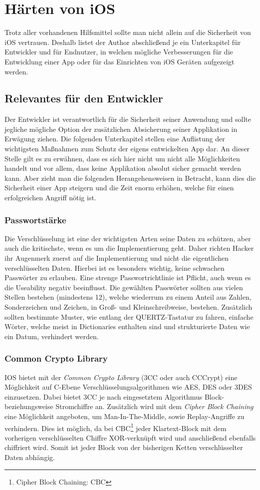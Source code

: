 \section{Härten von iOS}
	Trotz aller vorhandenen Hilfsmittel sollte man nicht allein auf die Sicherheit
	von iOS vertrauen. Deshalb listet der Author abschließend je ein Unterkapitel
	für Entwickler und für Endnutzer, in welchen mögliche Verbesserungen für die
	Entwicklung einer App oder für das Einrichten von iOS Geräten aufgezeigt
	werden.
	\subsection{Relevantes für den Entwickler}
		Der Entwickler ist verantwortlich für die Sicherheit seiner Anwendung und
		sollte jegliche mögliche Option der zusätzlichen Absicherung seiner
		Applikation in Erwägung ziehen. Die folgenden Unterkapitel stellen eine
		Auflistung der wichtigsten Maßnahmen zum Schutz der eigens entwickelten App
		dar. An dieser Stelle gilt es zu erwähnen, dass es sich hier nicht um nicht
		alle Möglichkeiten handelt und vor allem, dass keine Applikation absolut
		sicher gemacht werden kann. Aber zieht man die folgenden Herangehensweisen in
		Betracht, kann dies die Sicherheit einer App steigern und die
		Zeit enorm erhöhen, welche für einen erfolgreichen Angriff nötig ist.
		\subsubsection{Passwortstärke}
			Die Verschlüsselung ist eine der wichtigsten Arten seine Daten zu schützen,
			aber auch die kritischste, wenn es um die Implementierung geht. Daher richten
			Hacker ihr Augenmerk zuerst auf die Implementierung und nicht die
			eigentlichen verschlüsselten Daten. Hierbei ist es besonders wichtig, keine
			schwachen Passwörter zu erlauben. Eine strenge Passwortrichtlinie ist
			Pflicht, auch wenn es die Useability negativ beeinflusst. Die gewählten
			Passwörter sollten aus vielen Stellen bestehen (mindestens 12),
			welche wiederrum zu einem Anteil aus Zahlen, Sonderzeichen und Zeichen, in
			Groß- und Kleinschreibweise, bestehen. Zusätzlich sollten bestimmte Muster,
			wie entlang der QUERTZ-Tastatur zu fahren, einfache Wörter, welche meist in
			Dictionaries enthalten sind und strukturierte Daten wie ein Datum, verhindert
			werden.
		\subsubsection{Common Crypto Library}
			IOS bietet mit der \textsl{Common Crypto Library}\cite{3CC2007}
			(3CC oder auch CCCrypt) eine Möglichkeit auf C-Ebene 
			Verschlüsselungsalgorithmen wie AES, DES oder 3DES einzusetzen. Dabei bietet
			3CC je nach eingesetztem Algorithmus Block- beziehungsweise Stromchiffre an.
			Zusätzlich wird mit dem \textsl{Cipher Block Chaining} eine
			Möglichkeit angeboten, um Man-In-The-Middle, sowie Replay-Angriffe zu
			verhindern. Dies ist möglich, da bei CBC\footnote{Cipher Block Chaining: CBC}
			jeder Klartext-Block mit dem vorherigen verschlüsselten Chiffre XOR-verknüpft wird und anschließend
			ebenfalls chiffriert wird. Somit ist jeder Block von der bisherigen Ketten
			verschlüsselter Daten abhängig.
